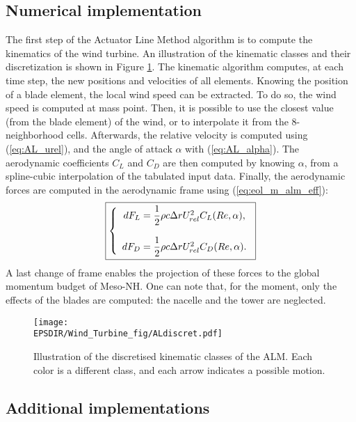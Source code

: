 \subsection{Numerical implementation}

The first step of the Actuator Line Method algorithm is to compute the kinematics of the wind turbine. An illustration of the kinematic classes and their discretization is shown in Figure \ref{fig:ALMdiscret}. The kinematic algorithm computes, at each time step, the new positions and velocities of all elements. 
Knowing the position of a blade element, the local wind speed can be extracted. To do so, the wind speed is computed at mass point. Then, it is possible to use the closest value (from the blade element) of the wind, or to interpolate it from the 8-neighborhood cells.
Afterwards, the relative velocity is computed using (\ref{eq:AL_urel}), and the angle of attack $\alpha$ with (\ref{eq:AL_alpha}). The aerodynamic coefficients $C_L$ and $C_D$ are then computed by knowing $\alpha$, from a spline-cubic interpolation of the tabulated input data. Finally, the aerodynamic forces are computed in the aerodynamic frame using (\ref{eq:eol_m_alm_eff}): 
\begin{equation}
\label{eq:eol_m_alm_eff_num}	
\fbox{$
\left\lbrace
\begin{array}{ccc}	
dF_{L} = \dfrac{1}{2} \rho c \Delta r U_{rel}^2 C_L(Re,\alpha),
\\   
\\
dF_{D} = \dfrac{1}{2} \rho c \Delta r U_{rel}^2 C_D(Re,\alpha).
\\
\end{array}\right.
$}
\end{equation}	
A last change of frame enables the projection of these forces to the global momentum budget of Meso-NH. One can note that, for the moment, only the effects of the blades are computed: the nacelle and the tower are neglected. 
\begin{figure}[h]
\centering
\texttt{[image: \\EPSDIR/Wind\_Turbine\_fig/ALdiscret.pdf]}
\caption{Illustration of the discretised kinematic classes of the ALM. Each color is a different class, and each arrow indicates a possible motion. \cite{joulin2019modelisation}}
\label{fig:ALMdiscret}  
\end{figure}


\subsection{Additional implementations}
